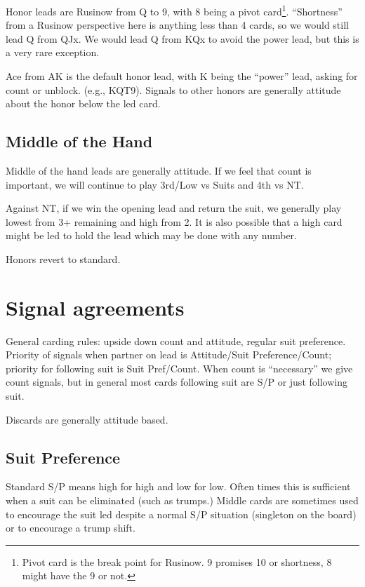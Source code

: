 \documentclass[tom-ari]{subfiles}
\begin{document}
Honor leads are Rusinow from Q to 9, with 8 being a pivot card\footnote{Pivot card is the break point for Rusinow. 9 promises 10 or shortness, 8 might have the 9 or not.}. ``Shortness'' from a Rusinow perspective here is anything less than 4 cards, so we would still lead Q from QJx. We would lead Q from KQx to avoid the power lead, but this is a very rare exception.  

Ace from AK is the default honor lead, with K being the ``power'' lead, asking for count or unblock. (e.g., KQT9). Signals to other honors are generally attitude about the honor below the led card.


\section{Middle of the Hand}

Middle of the hand leads are generally attitude. If we feel that count is important, we will continue to play 3rd/Low vs Suits and 4th vs NT.

Against NT, if we win the opening lead and return the suit, we generally play lowest from 3+ remaining and high from 2. It is also possible that a high card might be led to hold the lead which may be done with any number.

Honors revert to standard. 

\chapter{Signal agreements}

General carding rules: upside down count and attitude, regular suit preference. Priority of signals when partner on lead is Attitude/Suit Preference/Count; priority for following suit is Suit Pref/Count. When count is ``necessary'' we give count signals, but in general most cards following suit are S/P or just following suit.

Discards are generally attitude based.

\section{Suit Preference}  

Standard S/P means high for high and low for low.  Often times this is sufficient when a suit can be eliminated (such as trumps.) Middle cards are sometimes used to encourage the suit led despite a normal S/P situation (singleton on the board) or to encourage a trump shift.
\end{document}
